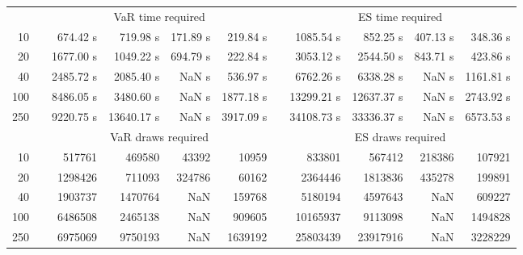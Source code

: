 {{\begin{longtable}{rr rrrr r rrrr}
\hline 
 & & \multicolumn{4}{c}{VaR time required} && \multicolumn{4}{c}{ES time required} \\ \cline{3-6}  \cline{8-11}
10 & & 674.42 s & 719.98 s & 171.89 s & 219.84 s && 1085.54 s & 852.25 s & 407.13 s & 348.36 s \\ 
20 & & 1677.00 s & 1049.22 s & 694.79 s & 222.84 s && 3053.12 s & 2544.50 s & 843.71 s & 423.86 s \\ 
40 & & 2485.72 s & 2085.40 s &  NaN s & 536.97 s && 6762.26 s & 6338.28 s &  NaN s & 1161.81 s \\ 
100 & & 8486.05 s & 3480.60 s &  NaN s & 1877.18 s && 13299.21 s & 12637.37 s &  NaN s & 2743.92 s \\ 
250 & & 9220.75 s & 13640.17 s &  NaN s & 3917.09 s && 34108.73 s & 33336.37 s &  NaN s & 6573.53 s \\ 
\hline 
 && \multicolumn{4}{c}{VaR draws required} &&   \multicolumn{4}{c}{ES draws required} \\  \cline{3-6}  \cline{8-11} 
10 & & 517761 & 469580 & 43392 & 10959 && 833801 & 567412 & 218386  & 107921 \\ 
20 & & 1298426 & 711093 & 324786 & 60162 && 2364446 & 1813836 & 435278  & 199891 \\ 
40 & & 1903737 & 1470764 & NaN & 159768 && 5180194 & 4597643 & NaN  & 609227 \\ 
100 & & 6486508 & 2465138 & NaN & 909605 && 10165937 & 9113098 & NaN  & 1494828 \\ 
250 & & 6975069 & 9750193 & NaN & 1639192 && 25803439 & 23917916 & NaN  & 3228229 \\ 
\hline 
\end{longtable} 
} 
} 
